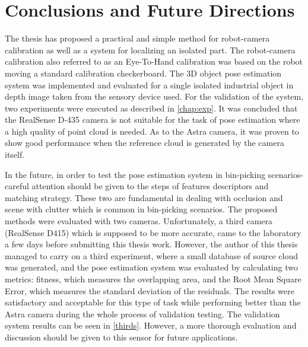 \chapter{Conclusions and Future Directions}
\label{chap:con}

The thesis has proposed a practical and simple method for robot-camera calibration as well as a system for localizing an isolated part. The robot-camera calibration also referred to as an Eye-To-Hand calibration was based on the robot moving a standard calibration checkerboard. The 3D object pose estimation system was implemented and evaluated for a single isolated industrial object in depth image taken from the sensory device used. For the validation of the system, two experiments were executed as described in \ref{chap:exp}. It was concluded that the RealSense D-435 camera is not suitable for the task of pose estimation where a high quality of point cloud is needed. As to the Astra camera, it was proven to show good performance when the reference cloud is generated by the camera itself.

In the future, in order to test the pose estimation system in bin-picking scenarios-careful attention should be given to the steps of features descriptors and matching strategy. These two are fundamental in dealing with occlusion and scene with clutter which is common in bin-picking scenarios. The proposed methods were evaluated with two cameras. Unfortunately, a third camera (RealSense D415) which is supposed to be more accurate, came to the laboratory a few days before submitting this thesis work. However, the author of this thesis managed to carry on a third experiment, where a small database of source cloud was generated, and the pose estimation system was evaluated by calculating two metrics: fitness, which measures the overlapping area, and the Root Mean Square Error, which measures the standard deviation of the residuals.
 The results were satisfactory and acceptable for this type of task while performing better than the Astra camera during the whole process of validation testing. The validation system results can be seen in \ref{thirds}. However, a more thorough evaluation and discussion should be given to this sensor for future applications.  




